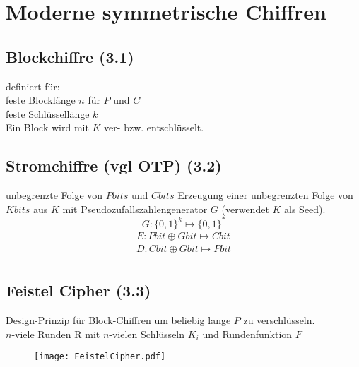 \chapter{Moderne symmetrische Chiffren}
\section{Blockchiffre (3.1)}
definiert für: \\
feste Blocklänge $n$ für $P$ und $C$ \\
feste Schlüssellänge $k$ \\
Ein Block wird mit $K$ ver- bzw. entschlüsselt.

\section{Stromchiffre (vgl OTP) (3.2)}
unbegrenzte Folge von $Pbits$ und $Cbits$
Erzeugung einer unbegrenzten Folge von $Kbits$ aus $K$ mit Pseudozufallszahlengenerator $G$ (verwendet $K$ als Seed).
$$
G: \{0,1\}^k \mapsto \{0,1\}^*
$$
\begin{align*}
E: Pbit \oplus Gbit \mapsto Cbit \\
D: Cbit \oplus Gbit \mapsto Pbit \\
\end{align*}

\section{Feistel Cipher (3.3)}
Design-Prinzip für Block-Chiffren um beliebig lange $P$ zu verschlüsseln. \\
$n$-viele Runden R mit $n$-vielen Schlüsseln $K_i$ und Rundenfunktion $F$

\begin{figure}[htp]
	\centering
	\texttt{[image: FeistelCipher.pdf]}
\end{figure}



